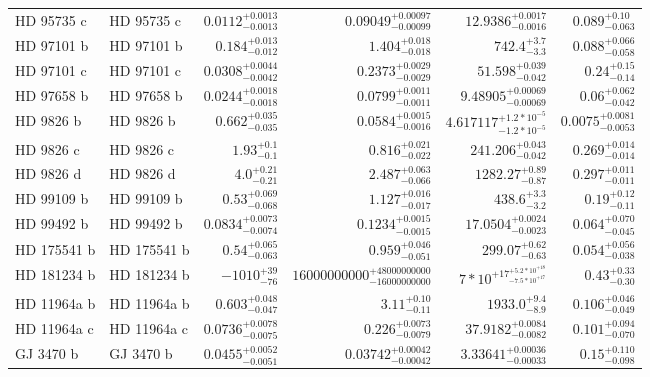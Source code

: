 \begin{longtable*}{llrrrr}
HD 95735 c & HD 95735 c & $0.0112^{+0.0013}_{-0.0013}$ & $0.09049^{+0.00097}_{-0.00099}$ & $12.9386^{+0.0017}_{-0.0016}$ & $0.089^{+0.10}_{-0.063}$ \\ 
HD 97101 b & HD 97101 b & $0.184^{+0.013}_{-0.012}$ & $1.404^{+0.018}_{-0.018}$ & $742.4^{+3.7}_{-3.3}$ & $0.088^{+0.066}_{-0.058}$ \\ 
HD 97101 c & HD 97101 c & $0.0308^{+0.0044}_{-0.0042}$ & $0.2373^{+0.0029}_{-0.0029}$ & $51.598^{+0.039}_{-0.042}$ & $0.24^{+0.15}_{-0.14}$ \\ 
HD 97658 b & HD 97658 b & $0.0244^{+0.0018}_{-0.0018}$ & $0.0799^{+0.0011}_{-0.0011}$ & $9.48905^{+0.00069}_{-0.00069}$ & $0.06^{+0.062}_{-0.042}$ \\ 
HD 9826 b & HD 9826 b & $0.662^{+0.035}_{-0.035}$ & $0.0584^{+0.0015}_{-0.0016}$ & $4.617117^{+1.2*10^{-5}}_{-1.2*10^{-5}}$ & $0.0075^{+0.0081}_{-0.0053}$ \\ 
HD 9826 c & HD 9826 c & $1.93^{+0.1}_{-0.1}$ & $0.816^{+0.021}_{-0.022}$ & $241.206^{+0.043}_{-0.042}$ & $0.269^{+0.014}_{-0.014}$ \\ 
HD 9826 d & HD 9826 d & $4.0^{+0.21}_{-0.21}$ & $2.487^{+0.063}_{-0.066}$ & $1282.27^{+0.89}_{-0.87}$ & $0.297^{+0.011}_{-0.011}$ \\ 
HD 99109 b & HD 99109 b & $0.53^{+0.069}_{-0.068}$ & $1.127^{+0.016}_{-0.017}$ & $438.6^{+3.3}_{-3.2}$ & $0.19^{+0.12}_{-0.11}$ \\ 
HD 99492 b & HD 99492 b & $0.0834^{+0.0073}_{-0.0074}$ & $0.1234^{+0.0015}_{-0.0015}$ & $17.0504^{+0.0024}_{-0.0023}$ & $0.064^{+0.070}_{-0.045}$ \\ 
HD 175541 b & HD 175541 b & $0.54^{+0.065}_{-0.063}$ & $0.959^{+0.046}_{-0.051}$ & $299.07^{+0.62}_{-0.63}$ & $0.054^{+0.056}_{-0.038}$ \\ 
HD 181234 b & HD 181234 b & $-1010^{+39}_{-76}$ & $16000000000^{+48000000000}_{-16000000000}$ & $7*10^{+17}^{+5.2*10^{+18}}_{-7.5*10^{+17}}$ & $0.43^{+0.33}_{-0.30}$ \\ 
HD 11964a b & HD 11964a b & $0.603^{+0.048}_{-0.047}$ & $3.11^{+0.10}_{-0.11}$ & $1933.0^{+9.4}_{-8.9}$ & $0.106^{+0.046}_{-0.049}$ \\ 
HD 11964a c & HD 11964a c & $0.0736^{+0.0078}_{-0.0075}$ & $0.226^{+0.0073}_{-0.0079}$ & $37.9182^{+0.0084}_{-0.0082}$ & $0.101^{+0.094}_{-0.070}$ \\ 
GJ 3470 b & GJ 3470 b & $0.0455^{+0.0052}_{-0.0051}$ & $0.03742^{+0.00042}_{-0.00042}$ & $3.33641^{+0.00036}_{-0.00033}$ & $0.15^{+0.110}_{-0.098}$ \\ 

\end{longtable*}

